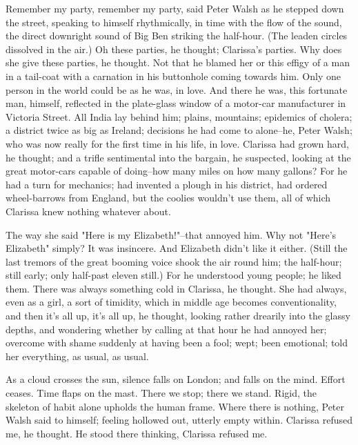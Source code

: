 \documentclass[lang=cn,10pt]{elegantbook}
\begin{document}
Remember my party, remember my party, said Peter Walsh as he
stepped down the street, speaking to himself rhythmically, in time
with the flow of the sound, the direct downright sound of Big Ben
striking the half-hour.  (The leaden circles dissolved in the air.)
Oh these parties, he thought; Clarissa's parties.  Why does she
give these parties, he thought.  Not that he blamed her or this
effigy of a man in a tail-coat with a carnation in his buttonhole
coming towards him.  Only one person in the world could be as he
was, in love.  And there he was, this fortunate man, himself,
reflected in the plate-glass window of a motor-car manufacturer in
Victoria Street.  All India lay behind him; plains, mountains;
epidemics of cholera; a district twice as big as Ireland; decisions
he had come to alone--he, Peter Walsh; who was now really for the
first time in his life, in love.  Clarissa had grown hard, he
thought; and a trifle sentimental into the bargain, he suspected,
looking at the great motor-cars capable of doing--how many miles on
how many gallons?  For he had a turn for mechanics; had invented a
plough in his district, had ordered wheel-barrows from England, but
the coolies wouldn't use them, all of which Clarissa knew nothing
whatever about.

The way she said "Here is my Elizabeth!"--that annoyed him.  Why
not "Here's Elizabeth" simply?  It was insincere.  And Elizabeth
didn't like it either.  (Still the last tremors of the great
booming voice shook the air round him; the half-hour; still early;
only half-past eleven still.)  For he understood young people; he
liked them.  There was always something cold in Clarissa, he
thought.  She had always, even as a girl, a sort of timidity, which
in middle age becomes conventionality, and then it's all up, it's
all up, he thought, looking rather drearily into the glassy depths,
and wondering whether by calling at that hour he had annoyed her;
overcome with shame suddenly at having been a fool; wept; been
emotional; told her everything, as usual, as usual.

As a cloud crosses the sun, silence falls on London; and falls on
the mind.  Effort ceases.  Time flaps on the mast.  There we stop;
there we stand.  Rigid, the skeleton of habit alone upholds the
human frame.  Where there is nothing, Peter Walsh said to himself;
feeling hollowed out, utterly empty within.  Clarissa refused me,
he thought.  He stood there thinking, Clarissa refused me.
\end{document}
